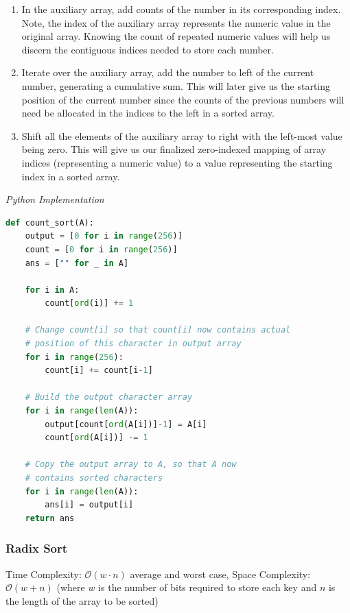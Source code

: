 \documentclass{article}
\newcommand{\bigO}{\mathcal{O}}
\begin{document}
    \begin{enumerate}
        \item In the auxiliary array, add counts of the number in its corresponding index. Note, the index of the auxiliary array represents the numeric value in the original array. Knowing the count of repeated numeric values will help us discern the contiguous indices needed to store each number. 
        \item Iterate over the auxiliary array, add the number to left of the current number, generating a cumulative sum. This will later give us the starting position of the current number since the counts of the previous numbers will need be allocated in the indices to the left in a sorted array.
        \item Shift all the elements of the auxiliary array to right with the left-most value being zero. This will give us our finalized zero-indexed mapping of array indices (representing a numeric value) to a value representing the starting index in a sorted array.
    \end{enumerate}

\vspace{8pt} \emph{Python Implementation}
\begin{lstlisting}[language=Python]
def count_sort(A):
    output = [0 for i in range(256)]
    count = [0 for i in range(256)]
    ans = ["" for _ in A]

    for i in A:
        count[ord(i)] += 1

    # Change count[i] so that count[i] now contains actual
    # position of this character in output array
    for i in range(256):
        count[i] += count[i-1]

    # Build the output character array
    for i in range(len(A)):
        output[count[ord(A[i])]-1] = A[i]
        count[ord(A[i])] -= 1

    # Copy the output array to A, so that A now
    # contains sorted characters
    for i in range(len(A)):
        ans[i] = output[i]
    return ans
\end{lstlisting}

    \subsubsection{Radix Sort}
    Time Complexity: $\bigO(w \cdot n)$ average and worst case, Space Complexity: $\bigO(w + n)$ (where $w$ is the number of bits required to store each key and $n$ is the length of the array to be sorted)
    
\end{document}
